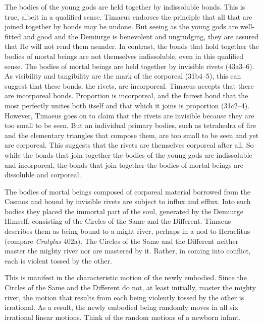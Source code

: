 The bodies of the young gods are held together by indissoluble bonds. This is true, albeit in a qualified sense. Timaeus endorses the principle that all that are joined together by bonds may be undone. But seeing as the young gods are well-fitted and good and the Demiurge is benevolent and ungrudging, they are assured that He will not rend them asunder. In contrast, the bonds that hold together the bodies of mortal beings are not themselves indissoluble, even in this qualified sense. The bodies of mortal beings are held together by invisible rivets (43a3--6). As visibility and tangibility are the mark of the corporeal (31b4–5), this can suggest that these bonds, the rivets, are incorporeal. Timaeus accepts that there are incorporeal bonds. Proportion is incorporeal, and the fairest bond that the most perfectly unites both itself and that which it joins is proportion (31c2–4). However, Timaeus goes on to claim that the rivets are invisible because they are too small to be seen. But an individual primary bodies, such as tetrahedra of fire and the elementary triangles that compose them, are too small to be seen and yet are corporeal. This suggests that the rivets are themselves corporeal after all. So while the bonds that join together the bodies of the young gods are indissoluble and incorporeal, the bonds that join together the bodies of mortal beings are dissoluble and corporeal.

The bodies of mortal beings composed of corporeal material borrowed from the Cosmos and bound by invisible rivets are subject to influx and efflux. Into such bodies they placed the immortal part of the soul, generated by the Demiurge Himself, consisting of the Circles of the Same and the Different. Timaeus describes them as being bound to a might river, perhaps in a nod to Heraclitus (compare \emph{Cratylus} 402a). The Circles of the Same and the Different neither master the mighty river nor are mastered by it. Rather, in coming into conflict, each is violent tossed by the other.

This is manifest in the characteristic motion of the newly embodied. Since the Circles of the Same and the Different do not, at least initially, master the mighty river, the motion that results from each being violently tossed by the other is irrational. As a result, the newly embodied being randomly moves in all six irrational linear motions. Think of the random motions of a newborn infant.

